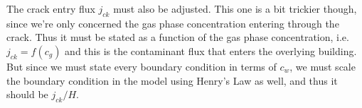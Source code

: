\documentclass{article}
\begin{document}
The crack entry flux $j_{ck}$ must also be adjusted.
This one is a bit trickier though, since we're only concerned the gas phase concentration entering through the crack.
Thus it must be stated as a function of the gas phase concentration, i.e. $j_{ck} = f(c_g)$ and this is the contaminant flux that enters the overlying building.
But since we must state every boundary condition in terms of $c_w$, we must scale the boundary condition in the model using Henry's Law as well, and thus it should be $j_{ck}/H$.
\end{document}
